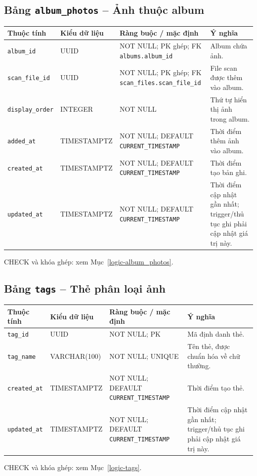 \subsection{Bảng \texttt{album\_\allowbreak{}photos} -- Ảnh thuộc album}
\label{dictionary-album_photos}
\begingroup
\footnotesize
\setlength{\tabcolsep}{3pt}
\begin{longtable}{>{\raggedright\arraybackslash}p{3.1cm}>{\raggedright\arraybackslash}p{2.5cm}>{\raggedright\arraybackslash}p{3.7cm}>{\raggedright\arraybackslash}p{4.3cm}}
\toprule
Thuộc tính & Kiểu dữ liệu & Ràng buộc / mặc định & Ý nghĩa \\
\midrule
\endhead
\texttt{album\_\allowbreak{}id} & UUID & NOT NULL; PK ghép; FK \texttt{albums.album\_\allowbreak{}id} & Album chứa ảnh. \\
\texttt{scan\_\allowbreak{}file\_\allowbreak{}id} & UUID & NOT NULL; PK ghép; FK \texttt{scan\_\allowbreak{}files.scan\_\allowbreak{}file\_\allowbreak{}id} & File scan được thêm vào album. \\
\texttt{display\_\allowbreak{}order} & INTEGER & NOT NULL & Thứ tự hiển thị ảnh trong album. \\
\texttt{added\_\allowbreak{}at} & TIMESTAMPTZ & NOT NULL; DEFAULT \texttt{CURRENT\_\allowbreak{}TIMESTAMP} & Thời điểm thêm ảnh vào album. \\
\texttt{created\_\allowbreak{}at} & TIMESTAMPTZ & NOT NULL; DEFAULT \texttt{CURRENT\_\allowbreak{}TIMESTAMP} & Thời điểm tạo bản ghi. \\
\texttt{updated\_\allowbreak{}at} & TIMESTAMPTZ & NOT NULL; DEFAULT \texttt{CURRENT\_\allowbreak{}TIMESTAMP} & Thời điểm cập nhật gần nhất; trigger/thủ tục ghi phải cập nhật giá trị này. \\
\bottomrule
\end{longtable}
\endgroup
CHECK và khóa ghép: xem Mục~\ref{logic-album_photos}.
\subsection{Bảng \texttt{tags} -- Thẻ phân loại ảnh}
\label{dictionary-tags}
\begingroup
\footnotesize
\setlength{\tabcolsep}{3pt}
\begin{longtable}{>{\raggedright\arraybackslash}p{3.1cm}>{\raggedright\arraybackslash}p{2.5cm}>{\raggedright\arraybackslash}p{3.7cm}>{\raggedright\arraybackslash}p{4.3cm}}
\toprule
Thuộc tính & Kiểu dữ liệu & Ràng buộc / mặc định & Ý nghĩa \\
\midrule
\endhead
\texttt{tag\_\allowbreak{}id} & UUID & NOT NULL; PK & Mã định danh thẻ. \\
\texttt{tag\_\allowbreak{}name} & VARCHAR(100) & NOT NULL; UNIQUE & Tên thẻ, được chuẩn hóa về chữ thường. \\
\texttt{created\_\allowbreak{}at} & TIMESTAMPTZ & NOT NULL; DEFAULT \texttt{CURRENT\_\allowbreak{}TIMESTAMP} & Thời điểm tạo thẻ. \\
\texttt{updated\_\allowbreak{}at} & TIMESTAMPTZ & NOT NULL; DEFAULT \texttt{CURRENT\_\allowbreak{}TIMESTAMP} & Thời điểm cập nhật gần nhất; trigger/thủ tục ghi phải cập nhật giá trị này. \\
\bottomrule
\end{longtable}
\endgroup
CHECK và khóa ghép: xem Mục~\ref{logic-tags}.
